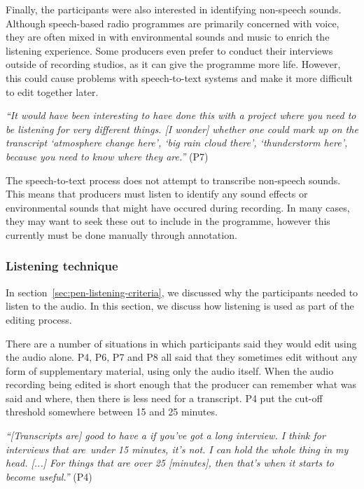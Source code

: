 
Finally, the participants were also interested in identifying non-speech sounds. Although speech-based radio programmes
are primarily concerned with voice, they are often mixed in with environmental sounds and music to enrich the listening
experience. Some producers even prefer to conduct their interviews outside of recording studios, as it can give the
programme more life. However, this could cause problems with speech-to-text systems and make it more difficult to edit
together later.


\textit{``It would have been interesting to have done this with a project where you need to be listening for very
different things. [I wonder] whether one could mark up on the transcript `atmosphere change here', `big rain cloud
there', `thunderstorm here', because you need to know where they are.''} (P7)

The speech-to-text process does not attempt to transcribe non-speech sounds. This means that producers must listen to
identify any sound effects or environmental sounds that might have occured during recording. In many cases, they may
want to seek these out to include in the programme, however this currently must be done manually through annotation.

\subsubsection{Listening technique}

In section~\ref{sec:pen-listening-criteria}, we discussed why the participants needed to listen to the audio. In this
section, we discuss how listening is used as part of the editing process.


There are a number of situations in which participants said they would edit using the audio alone. P4, P6, P7 and P8
all said that they sometimes edit without any form of supplementary material, using only the audio itself. When
the audio recording being edited is short enough that the producer can remember what was said and where, then
there is less need for a transcript. P4 put the cut-off threshold somewhere between 15 and 25 minutes.

\textit{``[Transcripts are] good to have a if you've got a long interview. I think for interviews that are under
15 minutes, it's not. I can hold the whole thing in my head. [...] For things that are over 25 [minutes], then that's
when it starts to become useful.''} (P4)

